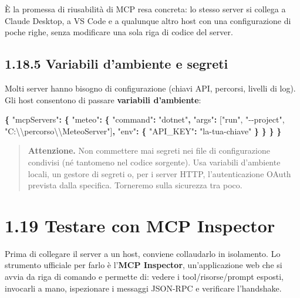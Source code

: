 \documentclass[
  italian,
  10pt,
]{book}
\newenvironment{Shaded}{\begin{snugshade}}{\end{snugshade}}
\newcommand{\CharTok}[1]{\textcolor[rgb]{0.31,0.60,0.02}{#1}}
\newcommand{\DataTypeTok}[1]{\textcolor[rgb]{0.13,0.29,0.53}{#1}}
\newcommand{\FunctionTok}[1]{\textcolor[rgb]{0.13,0.29,0.53}{\textbf{#1}}}
\newcommand{\OtherTok}[1]{\textcolor[rgb]{0.56,0.35,0.01}{#1}}
\newcommand{\StringTok}[1]{\textcolor[rgb]{0.31,0.60,0.02}{#1}}
\begin{document}
È la promessa di riusabilità di MCP resa concreta: lo stesso server si
collega a Claude Desktop, a VS Code e a qualunque altro host con una
configurazione di poche righe, senza modificare una sola riga di codice
del server.

\subsection{1.18.5 Variabili d'ambiente e
segreti}\label{variabili-dambiente-e-segreti}

Molti server hanno bisogno di configurazione (chiavi API, percorsi,
livelli di log). Gli host consentono di passare \textbf{variabili
d'ambiente}:

\begin{Shaded}
\begin{Highlighting}[]
\FunctionTok{\{}
  \DataTypeTok{"mcpServers"}\FunctionTok{:} \FunctionTok{\{}
    \DataTypeTok{"meteo"}\FunctionTok{:} \FunctionTok{\{}
      \DataTypeTok{"command"}\FunctionTok{:} \StringTok{"dotnet"}\FunctionTok{,}
      \DataTypeTok{"args"}\FunctionTok{:} \OtherTok{[}\StringTok{"run"}\OtherTok{,} \StringTok{"{-}{-}project"}\OtherTok{,} \StringTok{"C:}\CharTok{\textbackslash{}\textbackslash{}}\StringTok{percorso}\CharTok{\textbackslash{}\textbackslash{}}\StringTok{MeteoServer"}\OtherTok{]}\FunctionTok{,}
      \DataTypeTok{"env"}\FunctionTok{:} \FunctionTok{\{}
        \DataTypeTok{"API\_KEY"}\FunctionTok{:} \StringTok{"la{-}tua{-}chiave"}
      \FunctionTok{\}}
    \FunctionTok{\}}
  \FunctionTok{\}}
\FunctionTok{\}}
\end{Highlighting}
\end{Shaded}

\begin{quote}
\textbf{Attenzione.} Non commettere mai segreti nei file di
configurazione condivisi (né tantomeno nel codice sorgente). Usa
variabili d'ambiente locali, un gestore di segreti o, per i server HTTP,
l'autenticazione OAuth prevista dalla specifica. Torneremo sulla
sicurezza tra poco.
\end{quote}

\section{1.19 Testare con MCP
Inspector}\label{testare-con-mcp-inspector}

Prima di collegare il server a un host, conviene collaudarlo in
isolamento. Lo strumento ufficiale per farlo è l'\textbf{MCP Inspector},
un'applicazione web che si avvia da riga di comando e permette di:
vedere i tool/risorse/prompt esposti, invocarli a mano, ispezionare i
messaggi JSON-RPC e verificare l'handshake.
\end{document}
